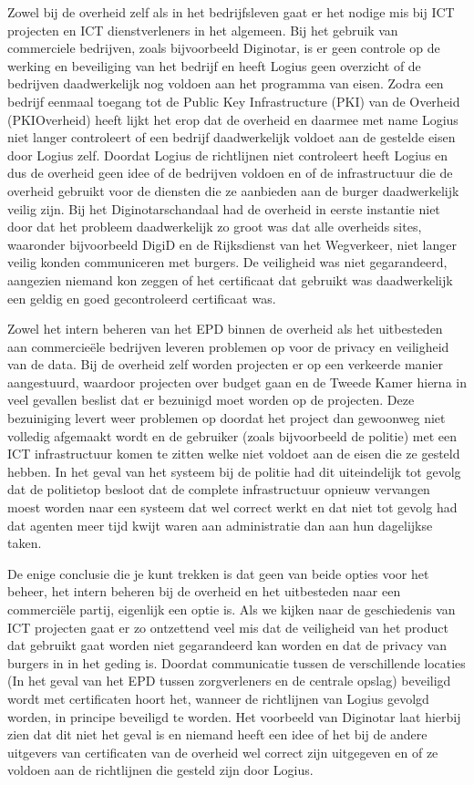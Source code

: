 Zowel bij de overheid zelf als in het bedrijfsleven gaat er het nodige mis bij ICT projecten en ICT dienstverleners in het algemeen. Bij het gebruik van commerciele bedrijven, zoals bijvoorbeeld Diginotar, is er geen controle op de werking en beveiliging van het bedrijf en heeft Logius geen overzicht of de bedrijven daadwerkelijk nog voldoen aan het programma van eisen. Zodra een bedrijf eenmaal toegang tot de Public Key Infrastructure (PKI) van de Overheid (PKIOverheid) heeft lijkt het erop dat de overheid en daarmee met name Logius niet langer controleert of een bedrijf daadwerkelijk voldoet aan de gestelde eisen door Logius zelf. Doordat Logius de richtlijnen niet controleert heeft Logius en dus de overheid geen idee of de bedrijven voldoen en of de infrastructuur die de overheid gebruikt voor de diensten die ze aanbieden aan de burger daadwerkelijk veilig zijn. Bij het Diginotarschandaal had de overheid in eerste instantie niet door dat het probleem daadwerkelijk zo groot was dat alle overheids sites, waaronder bijvoorbeeld DigiD en de Rijksdienst van het Wegverkeer, niet langer veilig konden communiceren met burgers. De veiligheid was niet gegarandeerd, aangezien niemand kon zeggen of het certificaat dat gebruikt was daadwerkelijk een geldig en goed gecontroleerd certificaat was.

Zowel het intern beheren van het EPD binnen de overheid als het uitbesteden aan commercie\"{e}le bedrijven leveren problemen op voor de privacy en veiligheid van de data. Bij de overheid zelf worden projecten er op een verkeerde manier aangestuurd, waardoor projecten over budget gaan en de Tweede Kamer hierna in veel gevallen beslist dat er bezuinigd moet worden op de projecten. Deze bezuiniging levert weer problemen op doordat het project dan gewoonweg niet volledig afgemaakt wordt en de gebruiker (zoals bijvoorbeeld de politie) met een ICT infrastructuur komen te zitten welke niet voldoet aan de eisen die ze gesteld hebben. In het geval van het systeem bij de politie had dit uiteindelijk tot gevolg dat de politietop besloot dat de complete infrastructuur opnieuw vervangen moest worden naar een systeem dat wel correct werkt en dat niet tot gevolg had dat agenten meer tijd kwijt waren aan administratie dan aan hun dagelijkse taken.

De enige conclusie die je kunt trekken is dat geen van beide opties voor het beheer, het intern beheren bij de overheid en het uitbesteden naar een commerci\"{e}le partij, eigenlijk een optie is. Als we kijken naar de geschiedenis van ICT projecten gaat er zo ontzettend veel mis dat de veiligheid van het product dat gebruikt gaat worden niet gegarandeerd kan worden en dat de privacy van burgers in in het geding is. Doordat communicatie tussen de verschillende locaties (In het geval van het EPD tussen zorgverleners en de centrale opslag) beveiligd wordt met certificaten hoort het, wanneer de richtlijnen van Logius gevolgd worden, in principe beveiligd te worden. Het voorbeeld van Diginotar laat hierbij zien dat dit niet het geval is en niemand heeft een idee of het bij de andere uitgevers van certificaten van de overheid wel correct zijn uitgegeven en of ze voldoen aan de richtlijnen die gesteld zijn door Logius.

